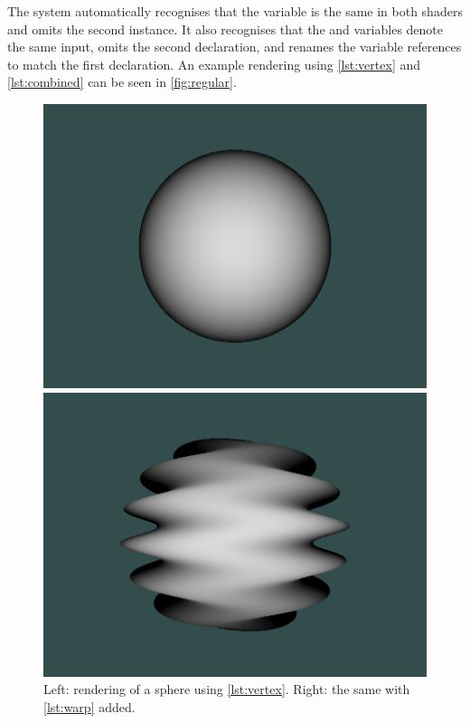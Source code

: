\documentclass[format=sigconf]{acmart}
\begin{document}
The system automatically recognises that the  variable is the same in both shaders and omits the second instance. It also recognises that the  and  variables denote the same input, omits the second declaration, and renames the variable references to match the first declaration. An example rendering using \autoref{lst:vertex} and \autoref{lst:combined} can be seen in \autoref{fig:regular}. \\

\begin{figure}[h]
  \begin{center}
    \begin{minipage}{.2\textwidth}
      \includegraphics[width=1.0\textwidth]{render-regular.png}
    \end{minipage}
    \begin{minipage}{.2\textwidth}
      \includegraphics[width=1.0\textwidth]{render-warped.png}
    \end{minipage}
  \end{center}
  \caption{Left: rendering of a sphere using \autoref{lst:vertex}. Right: the same with \autoref{lst:warp} added.}
  \label{fig:regular}
\end{figure}
\end{document}
